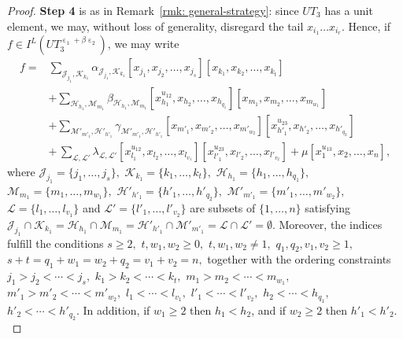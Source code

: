 \documentclass[a4paper,reqno]{amsart}
\theoremstyle{definition}
\numberwithin{equation}{section}
\numberwithin{theorem}{section}
\DeclareMathOperator{\e}{\varepsilon}
\begin{document}
\begin{proof}
\textbf{Step 4} is as in Remark~\ref{rmk: general-strategy}: since $UT_3$ has a unit element, we may,
without loss of generality, disregard the tail $x_{i_{1}}\dots x_{i_{r}}$. Hence, if $f \in I^L(UT_3^{\e_1+\beta\e_2}) $, we may write
\begin{align*}
    f = &\sum_{\mathcal{J}_{j_1}, \mathcal{K}_{k_1}} \alpha_{ \mathcal{J}_{j_1}, \mathcal{K}_{k_1}} [x_{j_1},x_{j_2},\dots,x_{j_s}][x_{k_1},x_{k_2},\dots,x_{k_t}]\\
    &+ \sum_{ \mathcal{H}_{h_1}, \mathcal{M}_{m_1}}  \beta_{\mathcal{H}_{h_1}, \mathcal{M}_{m_1}} [x_{h_1}^{u_{12}},x_{h_2},\dots,x_{h_{q_1}}][x_{m_1},x_{m_2},\dots,x_{m_{w_1}}]\\
    &+ \sum_{ \mathcal{M}'_{m'_1}, \mathcal{H}'_{h'_1}}  \gamma_{ \mathcal{M}'_{m'_1}, \mathcal{H}'_{h'_1}}[x_{m'_1},x_{m'_2},\dots,x_{m'_{w_2}}][x_{h'_1}^{u_{23}},x_{h'_2},\dots,x_{h'_{q_2}}]\\
    &+\, \sum_{\mathcal{L}, \mathcal{L}'}  \lambda_{\mathcal{L}, \mathcal{L}'}[x_{l_1}^{u_{12}},x_{l_2},\dots,x_{l_{v_1}}][x_{l'_1}^{u_{23}},x_{l'_2},\dots,x_{l'_{v_2}}] + \mu [x_{1}^{u_{13}},x_{2},\dots,x_{n}],
\end{align*}
where $\mathcal{J}_{j_1}=\{j_1,\ldots,j_s\},$ $\mathcal{K}_{k_1}=\{k_1,\ldots,k_t\},$ $\mathcal{H}_{h_1}=\{h_1,\ldots,h_{q_1}\},$ $\mathcal{M}_{m_1}=\{m_1,\ldots,m_{w_1}\},$ $\mathcal{H}'_{h'_1}=\{h'_1,\ldots,h'_{q_2}\},$ $\mathcal{M}'_{m'_1}=\{m'_1,\ldots,m'_{w_2}\},$ $\mathcal{L}=\{l_1,\ldots,l_{v_1}\}$ and $\mathcal{L}'=\{l'_1,\ldots,l'_{v_2}\}$
 are subsets of $\{1,\ldots, n\}$ satisfying $\mathcal{J}_{j_1}\cap \mathcal{K}_{k_1}=\mathcal{H}_{h_1}\cap \mathcal{M}_{m_1}=\mathcal{H}'_{h'_1}\cap \mathcal{M}'_{m'_1}=\mathcal{L}\cap \mathcal{L}'=\emptyset$. Moreover, the indices fulfill the conditions
$s\geq 2,$ $t, w_1,w_2\geq 0,$ $t,w_1,w_2\neq 1,$ $q_1,q_2,v_1,v_2\geq 1,$ $s+t=q_1+w_1=w_2+q_2=v_1+v_2=n,$ together with the ordering constraints $j_1>j_2<  \cdots < j_s,$ $k_1>k_2<  \cdots < k_t,$ $m_1> m_2< \cdots < m_{w_1},$ $m'_1> m'_2< \cdots < m'_{w_2},$
$l_1< \cdots < l_{v_1},$ $l'_1< \cdots < l'_{v_2},$ $h_2< \cdots <h_{q_1},$ $h'_2< \cdots <h'_{q_2}.$ In addition, if $w_1\geq 2$ then $h_1< h_2$, and  if $w_2\geq 2$ then $h'_1< h'_2.$


\end{proof}
\end{document}
